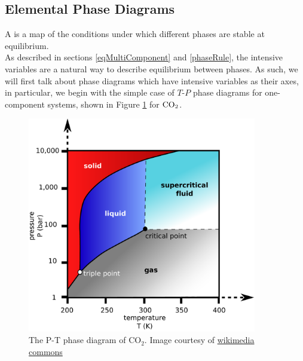 \documentclass[12pt]{article}
\begin{document}
\subsection{Elemental Phase Diagrams} \label{elementalPhaseDiagrams}

A  is a map of the conditions under which different phases are stable at equilibrium.\\
As described in sections \ref{eqMultiComponent} and \ref{phaseRule}, the intensive variables are a natural way to describe equilibrium between phases. As such, we will first talk about phase diagrams which have intensive variables as their axes, in particular, we begin with the simple case of $T$-$P$ phase diagrams for one-component systems, shown in Figure \ref{phaseDiagramCO2} for $\ce{CO2}$. 
%   
\begin{figure}[h]
\centering
\includegraphics[width=10cm]{Carbon_dioxide_pressure_temperature_phase_diagram2.pdf}
\caption{The P-T phase diagram of $\text{CO}_2$. Image courtesy of \href{https://commons.wikimedia.org/wiki/File:Carbon_dioxide_pressure-temperature_phase_diagram.svg}{wikimedia commons}}%
\label{phaseDiagramCO2}
\end{figure}
\end{document}
